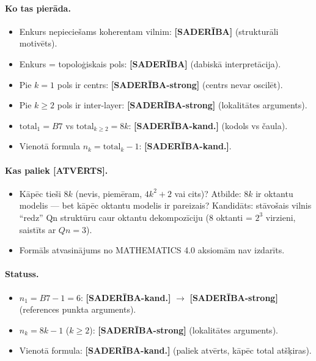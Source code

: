 \documentclass[12pt,a4paper]{article}
\begin{document}
\paragraph{Ko tas pierāda.}
\begin{itemize}
    \item Enkurs nepieciešams koherentam vilnim: \textbf{[SADERĪBA]} (strukturāli motivēts).
    \item Enkurs = topoloģiskais pols: \textbf{[SADERĪBA]} (dabiskā interpretācija).
    \item Pie $k=1$ pols ir centrs: \textbf{[SADERĪBA-strong]} (centrs nevar oscilēt).
    \item Pie $k\geq 2$ pols ir inter-layer: \textbf{[SADERĪBA-strong]} (lokalitātes arguments).
    \item $\text{total}_1 = B7$ vs $\text{total}_{k\geq 2} = 8k$: \textbf{[SADERĪBA-kand.]} (kodols vs čaula).
    \item Vienotā formula $n_k = \text{total}_k - 1$: \textbf{[SADERĪBA-kand.]}.
\end{itemize}

\paragraph{Kas paliek [ATVĒRTS].}
\begin{itemize}
    \item Kāpēc tieši $8k$ (nevis, piemēram, $4k^2+2$ vai cits)? Atbilde: $8k$ ir oktantu modelis — bet kāpēc oktantu modelis ir pareizais? Kandidāts: stāvošais vilnis ``redz'' Qn struktūru caur oktantu dekompozīciju (8 oktanti = $2^3$ virzieni, saistīts ar $Qn=3$).
    \item Formāls atvasinājums no MATHEMATICS 4.0 aksiomām nav izdarīts.
\end{itemize}

\paragraph{Statuss.}
\begin{itemize}
    \item $n_1 = B7-1 = 6$: \textbf{[SADERĪBA-kand.]} $\to$ \textbf{[SADERĪBA-strong]} (references punkta arguments).
    \item $n_k = 8k-1$ ($k\geq 2$): \textbf{[SADERĪBA-strong]} (lokalitātes arguments).
    \item Vienotā formula: \textbf{[SADERĪBA-kand.]} (paliek atvērts, kāpēc total atšķiras).
\end{itemize}
\end{document}
